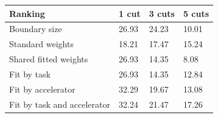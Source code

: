 \begin{tabular}{@{}llll@{}}
\toprule
Ranking & 1 cut & 3 cuts & 5 cuts \\
\midrule
Boundary size & 26.93 & 24.23 & 10.01 \\
Standard weights & 18.21 & 17.47 & 15.24 \\
Shared fitted weights & 26.93 & 14.35 & 8.08 \\
Fit by task & 26.93 & 14.35 & 12.84 \\
Fit by accelerator & 32.29 & 19.67 & 13.08 \\
Fit by task and accelerator & 32.24 & 21.47 & 17.26 \\
\bottomrule
\end{tabular}

